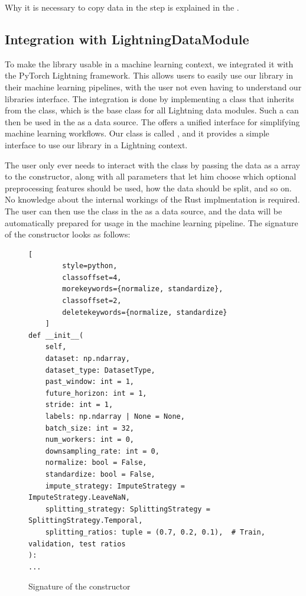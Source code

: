 \documentclass[review]{AIM_report}
\begin{document}
Why it is necessary to copy data in the \downsample step is explained in the .

\subsection{Integration with LightningDataModule}

To make the library usable in a machine learning context, we integrated it with the PyTorch Lightning framework. This allows users to easily use our library in their machine learning pipelines, with the user not even having to understand our libraries interface. The integration is done by implementing a class that inherits from the \lightningDM class, which is the base class for all Lightning data modules. Such a \lightningDM can then be used in the \lightningModule as a data source. The \lightningModule offers a unified interface for simplifying machine learning workflows. Our class is called \rustDM, and it provides a simple interface to use our library in a Lightning context.

The user only ever needs to interact with the \rustDM class by passing the data as a \numpy array to the constructor, along with all parameters that let him choose which optional preprocessing features should be used, how the data should be split, and so on. No knowledge about the internal workings of the Rust implmentation is required. The user can then use the \rustDM class in the \lightningModule as a data source, and the data will be automatically prepared for usage in the machine learning pipeline. The signature of the \rustDM constructor looks as follows:

\begin{figure}[H]
    \begin{lstlisting}[
        style=python, 
        classoffset=4, 
        morekeywords={normalize, standardize}, 
        classoffset=2, 
        deletekeywords={normalize, standardize}
    ]
def __init__(
    self,
    dataset: np.ndarray,
    dataset_type: DatasetType,
    past_window: int = 1,
    future_horizon: int = 1,
    stride: int = 1,
    labels: np.ndarray | None = None,
    batch_size: int = 32,
    num_workers: int = 0,
    downsampling_rate: int = 0,
    normalize: bool = False,
    standardize: bool = False,
    impute_strategy: ImputeStrategy = ImputeStrategy.LeaveNaN,
    splitting_strategy: SplittingStrategy = SplittingStrategy.Temporal,
    splitting_ratios: tuple = (0.7, 0.2, 0.1),  # Train, validation, test ratios
):
...
    \end{lstlisting}
    \caption{Signature of the \rustDM constructor}
    \label{fig:rustdm-signature}
\end{figure}
\end{document}
